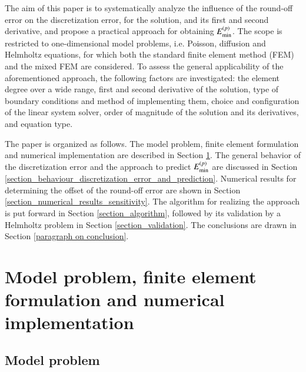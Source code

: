 \documentclass[review,3p]{elsarticle}
\begin{document}
The aim of this paper is to systematically analyze the influence of the round-off error on the discretization error, for the solution, and its first and second derivative, and propose a practical approach for obtaining ${E}_{\rm {min}}^{(p)}$.
The scope is restricted to one-dimensional model problems, i.e. Poisson, diffusion and Helmholtz equations, for which both the standard finite element method (FEM) and the mixed FEM\cite{boffi2013mixed} are considered.
To assess the general applicability of the aforementioned approach, the following factors are investigated: the element degree over a wide range, first and second derivative of the solution, type of boundary conditions and method of implementing them, choice and configuration of the linear system solver, order of magnitude of the solution and its derivatives, and equation type.

The paper is organized as follows. The model problem, finite element formulation and numerical implementation are described in Section \ref{section_model_problem_FEM_formulation_numerical_implementation}. The general behavior of the discretization error and the approach to predict ${E}_{\rm {min}}^{(p)}$ are discussed in Section \ref{section_behaviour_discretization_error_and_prediction}. Numerical results for determining the offset of the round-off error are shown in Section \ref{section_numerical_results_sensitivity}. The algorithm for realizing the approach is put forward in Section \ref{section_algorithm}, followed by its validation by a Helmholtz problem in Section \ref{section_validation}. The conclusions are drawn in Section \ref{paragraph on conclusion}.


\section{Model problem, finite element formulation and numerical implementation}	\label{section_model_problem_FEM_formulation_numerical_implementation}

\subsection{Model problem}
\end{document}
